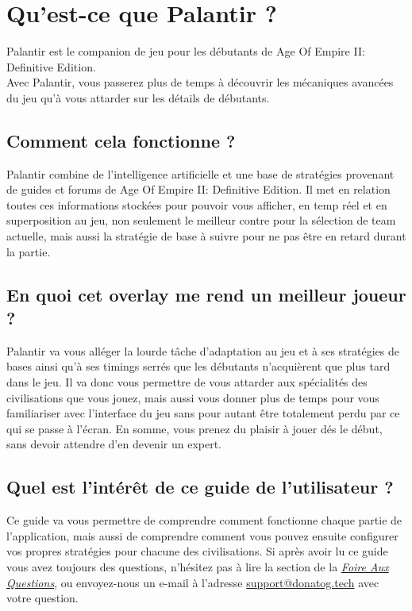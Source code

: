 
\section{Qu'est-ce que Palantir ?}
Palantir est le companion de jeu pour les débutants de Age Of Empire II: Definitive Edition.\\

Avec Palantir, vous passerez plus de temps à découvrir les mécaniques avancées du jeu qu'à vous attarder sur les détails de débutants.

\subsection{Comment cela fonctionne ?}
Palantir combine de l'intelligence artificielle et une base de stratégies provenant de guides et forums de Age Of Empire II: Definitive Edition. Il met en relation toutes ces informations stockées pour pouvoir vous afficher, en temp réel et en superposition au jeu, non seulement le meilleur contre pour la sélection de team actuelle, mais aussi la stratégie de base à suivre pour ne pas être en retard durant la partie.

\subsection{En quoi cet overlay me rend un meilleur joueur ?}
Palantir va vous alléger la lourde tâche d'adaptation au jeu et à ses stratégies de bases ainsi qu'à ses timings serrés que les débutants n'acquièrent que plus tard dans le jeu. Il va donc vous permettre de vous attarder aux spécialités des civilisations que vous jouez, mais aussi vous donner plus de temps pour vous familiariser avec l'interface du jeu sans pour autant être totalement perdu par ce qui se passe à l'écran. En somme, vous prenez du plaisir à jouer dés le début, sans devoir attendre d'en devenir un expert.

\subsection{Quel est l'intérêt de ce guide de l'utilisateur ?}
Ce guide va vous permettre de comprendre comment fonctionne chaque partie de l'application, mais aussi de comprendre comment vous pouvez ensuite configurer vos propres stratégies pour chacune des civilisations. Si après avoir lu ce guide vous avez toujours des questions, n'hésitez pas à lire la section de la \hyperref[sec:faq]{\textit{Foire Aux Questions}}, ou envoyez-nous un e-mail à l'adresse \href{mailto:support@donatog.tech}{support@donatog.tech} avec votre question.